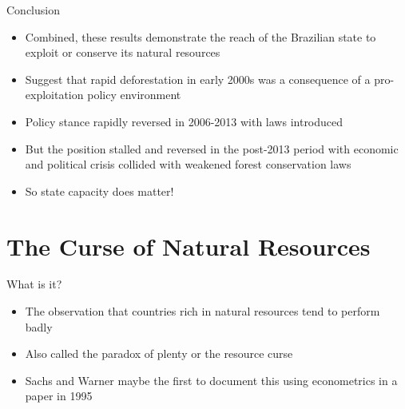 \documentclass[11pt,notes=hide,aspectratio=169,mathserif]{beamer}
\begin{document}
\begin{frame}{Conclusion}
\begin{itemize}
\item Combined, these results demonstrate the reach of the Brazilian state to exploit or conserve its natural resources
\item Suggest that rapid deforestation in early 2000s was a consequence of a pro-exploitation policy environment 
\item Policy stance rapidly reversed in 2006-2013 with laws introduced 
\item But the position stalled and reversed in the post-2013 period with economic and political crisis collided with weakened forest conservation laws 
\item So state capacity does matter!
\end{itemize}
\end{frame}

\section*{The Curse of Natural Resources}

\begin{frame}{What is it?}

\begin{itemize}
\item The observation that countries rich in natural resources tend to perform badly
\item Also called the paradox of plenty or the resource curse
\item Sachs and Warner maybe the first to document this using econometrics in a paper in 1995
\end{itemize}
\end{frame}
\end{document}
